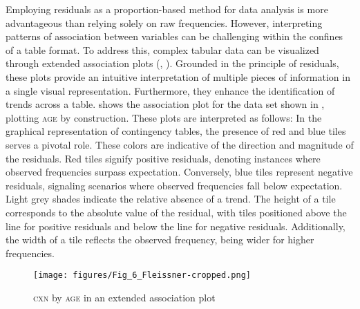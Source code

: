 \documentclass[output=paper,colorlinks,citecolor=brown]{langscibook}
\begin{document}
Employing residuals as a proportion-based method for data analysis is more advantageous than relying solely on raw frequencies. However, interpreting patterns of association between variables can be challenging within the confines of a table format. To address this, complex tabular data can be visualized through extended association plots (\citealt{Cohen1980}, \citealt{Meyer2003}). Grounded in the principle of residuals, these plots provide an intuitive interpretation of multiple pieces of information in a single visual representation. Furthermore, they enhance the identification of trends across a table.  shows the association plot for the data set shown in , plotting \textsc{age} by construction. These plots are interpreted as follows: In the graphical representation of contingency tables, the presence of red and blue tiles serves a pivotal role. These colors are indicative of the direction and magnitude of the residuals. Red tiles signify positive residuals, denoting instances where observed frequencies surpass expectation. Conversely, blue tiles represent negative residuals, signaling scenarios where observed frequencies fall below expectation. Light grey shades indicate the relative absence of a trend. The height of a tile corresponds to the absolute value of the residual, with tiles positioned above the line for positive residuals and below the line for negative residuals. Additionally, the width of a tile reflects the observed frequency, being wider for higher frequencies.

\begin{figure}
    \texttt{[image: figures/Fig\_6\_Fleissner-cropped.png]}
    \caption{\textsc{cxn} \textup{by} \textsc{age} \textup{in an extended association plot}}
    \label{fig:fleissner:4}
\end{figure}
\end{document}
